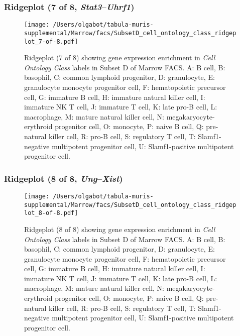 \subsubsection{Ridgeplot (7 of 8, \emph{Stat3}--\emph{Uhrf1})}
\begin{figure}[h]
\centering
\texttt{[image: /Users/olgabot/tabula-muris-supplemental/Marrow/facs/SubsetD\_cell\_ontology\_class\_ridgeplot\_7-of-8.pdf]}

\caption{ Ridgeplot (7 of 8)  showing gene expression enrichment in \emph{Cell Ontology Class} labels in Subset D of Marrow FACS. A: B cell, B: basophil, C: common lymphoid progenitor, D: granulocyte, E: granulocyte monocyte progenitor cell, F: hematopoietic precursor cell, G: immature B cell, H: immature natural killer cell, I: immature NK T cell, J: immature T cell, K: late pro-B cell, L: macrophage, M: mature natural killer cell, N: megakaryocyte-erythroid progenitor cell, O: monocyte, P: naive B cell, Q: pre-natural killer cell, R: pro-B cell, S: regulatory T cell, T: Slamf1-negative multipotent progenitor cell, U: Slamf1-positive multipotent progenitor cell.}
\end{figure}


\clearpage

\subsubsection{Ridgeplot (8 of 8, \emph{Ung}--\emph{Xist})}
\begin{figure}[h]
\centering
\texttt{[image: /Users/olgabot/tabula-muris-supplemental/Marrow/facs/SubsetD\_cell\_ontology\_class\_ridgeplot\_8-of-8.pdf]}

\caption{ Ridgeplot (8 of 8)  showing gene expression enrichment in \emph{Cell Ontology Class} labels in Subset D of Marrow FACS. A: B cell, B: basophil, C: common lymphoid progenitor, D: granulocyte, E: granulocyte monocyte progenitor cell, F: hematopoietic precursor cell, G: immature B cell, H: immature natural killer cell, I: immature NK T cell, J: immature T cell, K: late pro-B cell, L: macrophage, M: mature natural killer cell, N: megakaryocyte-erythroid progenitor cell, O: monocyte, P: naive B cell, Q: pre-natural killer cell, R: pro-B cell, S: regulatory T cell, T: Slamf1-negative multipotent progenitor cell, U: Slamf1-positive multipotent progenitor cell.}
\end{figure}


\clearpage

